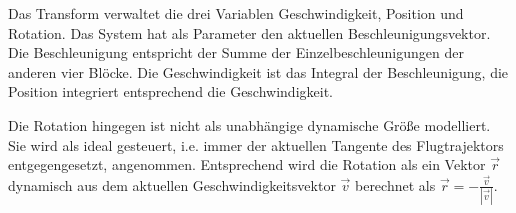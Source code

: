 \label{transform}
Das Transform verwaltet die drei Variablen Geschwindigkeit, Position und Rotation. Das System hat als Parameter den aktuellen Beschleunigungsvektor. Die Beschleunigung entspricht der Summe der Einzelbeschleunigungen der anderen vier Blöcke. Die Geschwindigkeit ist das Integral der Beschleunigung, die Position integriert entsprechend die Geschwindigkeit.

Die Rotation hingegen ist nicht als unabhängige dynamische Größe modelliert. Sie wird als ideal gesteuert, i.e. immer der aktuellen Tangente des Flugtrajektors entgegengesetzt, angenommen. Entsprechend wird die Rotation als ein Vektor $\vec r$ dynamisch aus dem aktuellen Geschwindigkeitsvektor $\vec v$ berechnet als $\vec r = -\frac{\vec v}{|\vec v|}$.\\ \\